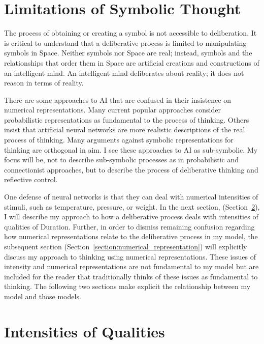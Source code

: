 \section{Limitations of Symbolic Thought}

The process of obtaining or creating a symbol is not accessible to
deliberation.  It is critical to understand that a deliberative
process is limited to manipulating symbols in Space.  Neither symbols
nor Space are real; instead, symbols and the relationships that order
them in Space are artificial creations and constructions of an
intelligent mind.  An intelligent mind deliberates about reality; it
does not reason in terms of reality.

There are some approaches to AI that are confused in their insistence
on numerical representations.  Many current popular approaches
consider probabilistic representations as fundamental to the process
of thinking.  Others insist that artificial neural networks are more
realistic descriptions of the real process of thinking.  Many
arguments against symbolic representations for thinking are orthogonal
in aim.  I see these approaches to AI as sub-symbolic.  My focus will
be, not to describe sub-symbolic processes as in probabilistic and
connectionist approaches, but to describe the process of deliberative
thinking and reflective control.

One defense of neural networks is that they can deal with numerical
intensities of stimuli, such as temperature, pressure, or weight.  In
the next section, (Section~\ref{section:intensities_of_qualities}), I
will describe my approach to how a deliberative process deals with
intensities of qualities of Duration.  Further, in order to dismiss
remaining confusion regarding how numerical representations relate to
the deliberative process in my model, the subsequent section
(Section~\ref{section:numerical_representation}) will explicitly
discuss my approach to thinking using numerical representations.
These issues of intensity and numerical representations are not
fundamental to my model but are included for the reader that
traditionally thinks of these issues as fundamental to thinking.  The
following two sections make explicit the relationship between my model
and those models.

\section{Intensities of Qualities}
\label{section:intensities_of_qualities}

